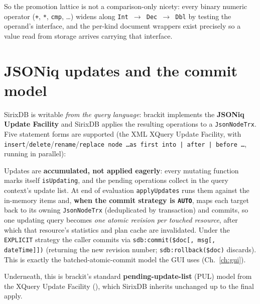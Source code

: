 \documentclass[11pt,a4paper,oneside]{report}
\newcommand{\dcap}[1]{\par\vspace{1pt}\noindent{\small\sffamily\bfseries\color{slate}#1}\par\vspace{-2pt}}
\theoremstyle{sirixthm}
\newcommand{\code}[1]{\texttt{#1}}
\begin{document}
\noindent So the promotion lattice is not a comparison-only nicety: every binary numeric operator
(\code{+}, \code{*}, \code{cmp}, \ldots) widens along \code{Int $\to$ Dec $\to$ Dbl} by testing the
operand's interface, and the per-kind document wrappers exist precisely so a value read from storage
arrives carrying that interface.

\section{JSONiq updates and the commit model}

SirixDB is writable \emph{from the query language}: brackit implements the \textbf{JSONiq Update
Facility} and SirixDB applies the resulting operations to a \code{JsonNodeTrx}. Five statement forms are
supported (the XML XQuery Update Facility, with \code{insert}/\allowbreak\code{delete}/\allowbreak\code{rename}/\allowbreak\code{replace
node \ldots as first into | after | before \ldots}, running in parallel):

\dcap{JSONiq update statements}

Updates are \textbf{accumulated, not applied eagerly}: every mutating function marks itself
\code{isUpdating}, and the pending operations collect in the query context's update list. At end of
evaluation \code{applyUpdates} runs them against the in-memory items and, \textbf{when the commit
strategy is \code{AUTO}}, maps each target back to its owning \code{JsonNodeTrx} (deduplicated by
transaction) and commits, so one updating query becomes \emph{one atomic revision per touched
resource}, after which that resource's statistics and plan cache are invalidated. Under the
\code{EXPLICIT} strategy the caller commits via \code{sdb:commit(\$doc[, msg[, dateTime]])} (returning
the new revision number; \code{sdb:rollback(\$doc)} discards). This is exactly the batched-atomic-commit
model the GUI uses (Ch.~\ref{ch:gui}).

Underneath, this is brackit's standard \textbf{pending-update-list} (PUL) model from the XQuery Update
Facility (), which SirixDB inherits unchanged up to the final apply.
\end{document}
